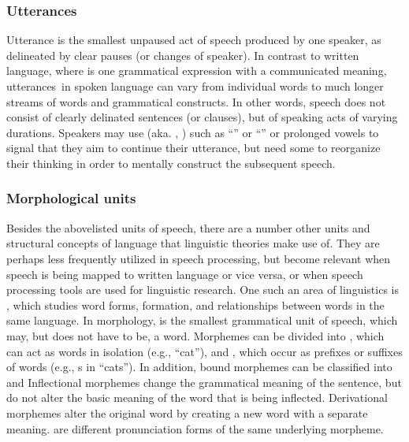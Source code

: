 \documentclass[letterpaper,10pt,english]{jupyterBook}
\begin{document}
\subsubsection{Utterances}
\label{\detokenize{Introduction/Linguistic_structure_of_speech:utterances}}
\sphinxAtStartPar
Utterance is the smallest unpaused act of speech produced by one
speaker, as delineated by clear pauses (or changes of speaker). In
contrast to written language, where  is one grammatical
expression with a communicated meaning, utterances in spoken language
can vary from individual words to much longer streams of words and
grammatical constructs. In other words, speech does not consist of
clearly delinated sentences (or clauses), but of speaking acts of
varying durations. Speakers may use
 (aka.
, ) such as “” or “” or prolonged
vowels to signal that they aim to continue their utterance, but need
some to reorganize their thinking in order to mentally construct the
subsequent speech.


\subsubsection{Morphological units}
\label{\detokenize{Introduction/Linguistic_structure_of_speech:morphological-units}}
\sphinxAtStartPar
Besides the above\sphinxhyphen{}listed units of speech, there are a number other units
and structural concepts of language that linguistic theories make use
of. They are perhaps less frequently utilized in speech processing, but
become relevant when speech is being mapped to written language or vice
versa, or when speech processing tools are used for linguistic research.
One such an area of linguistics is , which studies word
forms, formation, and relationships between words in the same language.
In morphology,  is the smallest grammatical unit of speech,
which may, but does not have to be, a word. Morphemes can be divided
into , which can act as words in isolation (e.g.,
“cat”), and , which occur as prefixes or suffixes of
words (e.g., \sphinxhyphen{}s in “cats”). In addition, bound morphemes can be
classified into  and 
Inflectional morphemes change the grammatical meaning of the sentence,
but do not alter the basic meaning of the word that is being inflected.
Derivational morphemes alter the original word by creating a new word
with a separate meaning.  are different pronunciation forms
of the same underlying morpheme.
\end{document}

